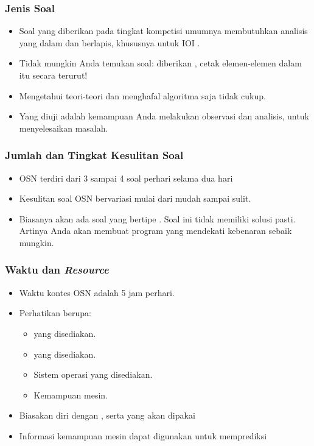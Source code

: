 \begin{frame}
  \frametitle{Jenis Soal}
  \begin{itemize}
    \item Soal yang diberikan pada tingkat kompetisi umumnya membutuhkan analisis yang dalam dan berlapis, khususnya untuk IOI .
    \item Tidak mungkin Anda temukan soal: diberikan \farray, cetak elemen-elemen dalam \farray itu secara terurut!
    \item Mengetahui teori-teori dan menghafal algoritma saja tidak cukup.
    \item Yang diuji adalah kemampuan Anda melakukan observasi dan analisis, untuk menyelesaikan masalah.
  \end{itemize}
\end{frame}

\begin{frame}
  \frametitle{Jumlah dan Tingkat Kesulitan Soal}
    
  \begin{itemize}
    \item OSN terdiri dari 3 sampai 4 soal perhari selama dua hari
    \item Kesulitan soal OSN bervariasi mulai dari mudah sampai sulit.
    \item Biasanya akan ada soal yang bertipe . Soal ini tidak memiliki solusi pasti. Artinya Anda akan membuat program yang mendekati kebenaran sebaik mungkin.
  \end{itemize}
\end{frame}

\begin{frame}
  \frametitle{Waktu dan \textit{Resource}}
  \begin{itemize}
    \item Waktu kontes OSN adalah 5 jam perhari.
    \item Perhatikan  berupa:
    \begin{itemize}
      \item {} yang disediakan.
      \item {} yang disediakan.
      \item Sistem operasi yang disediakan.
      \item Kemampuan mesin.
    \end{itemize}
    \item Biasakan diri dengan ,  serta  yang akan dipakai
    \item Informasi kemampuan mesin dapat digunakan untuk memprediksi 
  \end{itemize}
\end{frame}

